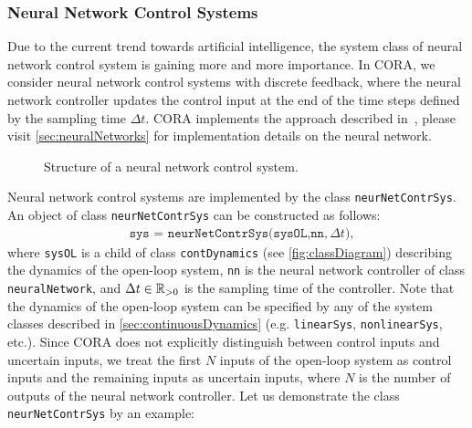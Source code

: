 \subsubsection{Neural Network Control Systems} \label{sec:neuralNetContrSys}

Due to the current trend towards artificial intelligence, the system class of neural network control system is gaining more and more importance.
In CORA, we consider neural network control systems with discrete feedback,
where the neural network controller updates the control input at the end of the time steps defined by the sampling time $\Delta t$.
CORA implements the approach described in~\cite{Kochdumper2023b,ladner2023a},
please visit \cref{sec:neuralNetworks} for implementation details on the neural network.

\begin{figure}[htb]
  \centering	
    \footnotesize
    \caption{Structure of a neural network control system.}
    \label{fig:neuralNetworkControlledSys}		
\end{figure}

Neural network control systems are implemented by the class \texttt{neurNetContrSys}. An object of class \texttt{neurNetContrSys} can be constructed as follows:
\begin{equation*}
	\begin{split}
		& \texttt{sys = neurNetContrSys(sysOL,nn},\Delta t),
	\end{split}
\end{equation*}
where \texttt{sysOL} is a child of class \texttt{contDynamics} (see \cref{fig:classDiagram}) describing the dynamics of the open-loop system,
\texttt{nn} is the neural network controller of class \texttt{neuralNetwork},
and $\Delta t \in \mathbb{R}_{> 0}$ is the sampling time of the controller.
Note that the dynamics of the open-loop system can be specified by any of the system classes described in \cref{sec:continuousDynamics} (e.g. \texttt{linearSys}, \texttt{nonlinearSys}, etc.).
Since CORA does not explicitly distinguish between control inputs and uncertain inputs, we treat the first $N$ inputs of the open-loop system as control inputs and the remaining inputs as uncertain inputs, where $N$ is the number of outputs of the neural network controller.
Let us demonstrate the class \texttt{neurNetContrSys} by an example:

\begin{center}
\begin{minipage}[t]{0.95\textwidth}
\footnotesize 

\end{minipage}
\end{center}

